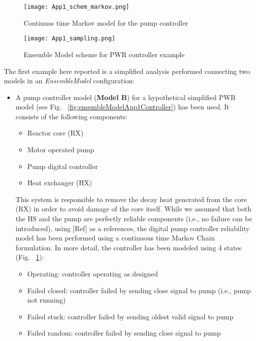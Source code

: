 \begin{figure}
    \centering
    \texttt{[image: App1\_schem\_markov.png]}
    \caption{Continuos time Markov model for the pump controller}
    \label{fig:ensembleModelAppMarkov}
\end{figure}
\begin{figure}
    \centering
    \texttt{[image: App1\_sampling.png]}
    \caption{Ensemble Model scheme for PWR controller example}
    \label{fig:ensembleModelApp1sampling}
\end{figure}
The first example here reported is a simplified analysis performed connecting two models in an \textit{EnsembleModel} 
configuration:
\begin{itemize}
  \item A pump controller model (\textbf{Model B}) for a hypothetical simplified PWR model (see Fig. ~\ref{fig:ensembleModelApp1Controller}) has
          been used. It consists of the following components:
          \begin{itemize}
             \item Reactor core (RX)
             \item Motor operated pump
             \item Pump digital controller
             \item Heat exchanger (HX)
          \end{itemize}
          This system is responsible to remove the decay heat generated from the core (RX) in order to avoid damage of the core itself. While we assumed that both 
          the HS and the pump are perfectly reliable components (i.e., no failure can be introduced), using [Ref] as a references, the digital pump controller reliability 
          model has been performed using a continuous time Markov Chain formulation.
          In more detail, the controller has been modeled using 4 states (Fig. ~\ref{fig:ensembleModelAppMarkov}):
          \begin{itemize}    
            \item Operating: controller operating as designed     
            \item Failed closed: controller failed by sending close signal to pump (i.e., pump not running)
            \item Failed stuck: controller failed by sending oldest valid signal to pump  
            \item Failed random: controller failed by sending close signal to pump  
          \end{itemize} 

\end{itemize}
